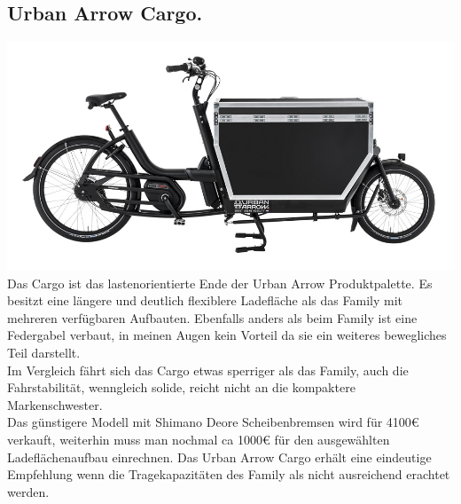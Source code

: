 \documentclass[a4paper,ngerman, 14pt] {scrartcl}
\begin{document}
\subsection{Urban Arrow Cargo.}
\includegraphics[scale=0.415]{urban_arrow_cargo.jpg}\\
Das Cargo ist das lastenorientierte Ende der Urban Arrow Produktpalette. Es besitzt eine längere und deutlich flexiblere Ladefläche als das Family mit mehreren verfügbaren Aufbauten. Ebenfalls anders als beim Family ist eine Federgabel verbaut, in meinen Augen kein Vorteil da sie ein weiteres bewegliches Teil darstellt.\\
Im Vergleich fährt sich das Cargo etwas sperriger als das Family, auch die Fahrstabilität, wenngleich solide, reicht nicht an die kompaktere Markenschwester.\\
Das günstigere Modell mit Shimano Deore Scheibenbremsen wird für 4100€ verkauft, weiterhin muss man nochmal ca 1000€ für den ausgewählten Ladeflächenaufbau einrechnen. Das Urban Arrow Cargo erhält eine eindeutige Empfehlung wenn die Tragekapazitäten des Family als nicht ausreichend erachtet werden.
\end{document}
